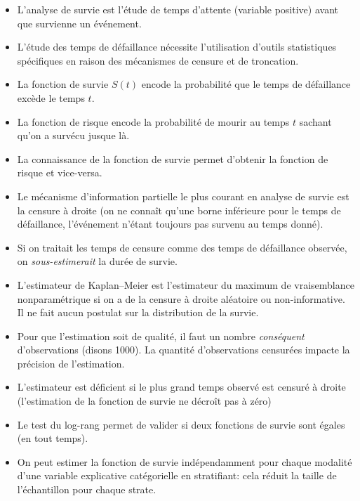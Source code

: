 \documentclass[
  11pt,
  letterpaper,
]{book}
\providecommand{\tightlist}{%
  \setlength{\itemsep}{0pt}\setlength{\parskip}{0pt}}\usepackage{longtable,booktabs,array}
\theoremstyle{definition}
\theoremstyle{remark}
\begin{document}
\begin{tcolorbox}[enhanced jigsaw, opacityback=0, titlerule=0mm, colbacktitle=quarto-callout-note-color!10!white, rightrule=.15mm, coltitle=black, bottomtitle=1mm, leftrule=.75mm, breakable, colback=white, title=\textcolor{quarto-callout-note-color}{\faInfo}\hspace{0.5em}{En résumé}, colframe=quarto-callout-note-color-frame, arc=.35mm, toprule=.15mm, bottomrule=.15mm, toptitle=1mm, left=2mm, opacitybacktitle=0.6]

\begin{itemize}
\tightlist
\item
  L'analyse de survie est l'étude de temps d'attente (variable positive)
  avant que survienne un événement.
\item
  L'étude des temps de défaillance nécessite l'utilisation d'outils
  statistiques spécifiques en raison des mécanismes de censure et de
  troncation.
\item
  La fonction de survie \(S(t)\) encode la probabilité que le temps de
  défaillance excède le temps \(t\).
\item
  La fonction de risque encode la probabilité de mourir au temps \(t\)
  sachant qu'on a survécu jusque là.
\item
  La connaissance de la fonction de survie permet d'obtenir la fonction
  de risque et vice-versa.
\item
  Le mécanisme d'information partielle le plus courant en analyse de
  survie est la censure à droite (on ne connaît qu'une borne inférieure
  pour le temps de défaillance, l'événement n'étant toujours pas survenu
  au temps donné).
\item
  Si on traitait les temps de censure comme des temps de défaillance
  observée, on \emph{sous-estimerait} la durée de survie.
\item
  L'estimateur de Kaplan--Meier est l'estimateur du maximum de
  vraisemblance nonparamétrique si on a de la censure à droite aléatoire
  ou non-informative. Il ne fait aucun postulat sur la distribution de
  la survie.
\item
  Pour que l'estimation soit de qualité, il faut un nombre
  \emph{conséquent} d'observations (disons 1000). La quantité
  d'observations censurées impacte la précision de l'estimation.
\item
  L'estimateur est déficient si le plus grand temps observé est censuré
  à droite (l'estimation de la fonction de survie ne décroît pas à zéro)
\item
  Le test du log-rang permet de valider si deux fonctions de survie sont
  égales (en tout temps).
\item
  On peut estimer la fonction de survie indépendamment pour chaque
  modalité d'une variable explicative catégorielle en stratifiant: cela
  réduit la taille de l'échantillon pour chaque strate.
\end{itemize}

\end{tcolorbox}
\end{document}
